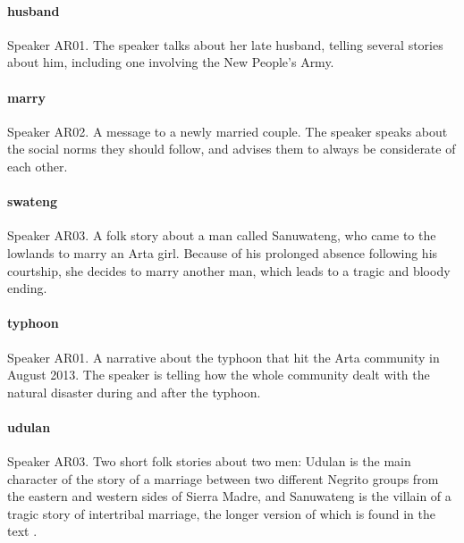 \paragraph{husband}	%
Speaker AR01. The speaker talks about her late husband, telling several stories about him, including one involving the New People's Army.

\paragraph{marry}		%
Speaker AR02. A message to a newly married couple. The speaker speaks about the social norms they should follow, and advises them to always be considerate of each other.

\paragraph{swateng}	%
Speaker AR03. A folk story about a man called Sanuwateng, who came to the lowlands to marry an Arta girl. Because of his prolonged absence following his courtship, she decides to marry another man, which leads to a tragic and bloody ending.

\paragraph{typhoon}	%
Speaker AR01. A narrative about the typhoon that hit the Arta community in August 2013. The speaker is telling how the whole community dealt with the natural disaster during and after the typhoon.

\paragraph{udulan}	%
Speaker AR03. Two short folk stories about two men: Udulan is the main character of the story of a marriage between two different Negrito groups from the eastern and western sides of Sierra Madre, and Sanuwateng is the villain of a tragic story of intertribal marriage, the longer version of which is found in the text .



